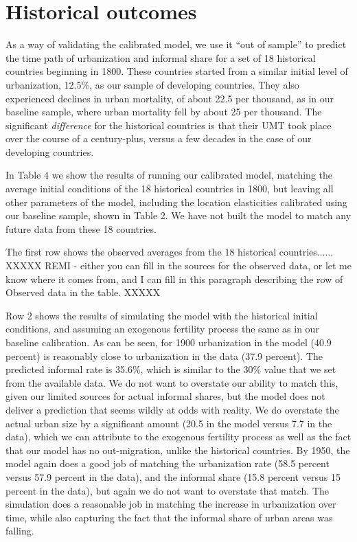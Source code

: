 \documentclass[10pt]{article}
\begin{document}
\onehalfspacing 

\section{Historical outcomes}

As a way of validating the calibrated model, we use it ``out of sample'' to predict the time path of urbanization and informal share for a set of 18 historical countries beginning in 1800. These countries started from a similar initial level of urbanization, 12.5\%, as our sample of developing countries. They also experienced declines in urban mortality, of about 22.5 per thousand, as in our baseline sample, where urban mortality fell by about 25 per thousand. The significant \textit{difference} for the historical countries is that their UMT took place over the course of a century-plus, versus a few decades in the case of our developing countries.

In Table 4 we show the results of running our calibrated model, matching the average initial conditions of the 18 historical countries in 1800, but leaving all other parameters of the model, including the location elasticities calibrated using our baseline sample, shown in Table 2. We have not built the model to match any future data from these 18 countries.

The first row shows the observed averages from the 18 historical countries......
XXXXX
REMI - either you can fill in the sources for the observed data, or let me know where it comes from, and I can fill in this paragraph describing the row of Observed data in the table.
XXXXX

Row 2 shows the results of simulating the model with the historical initial conditions, and assuming an exogenous fertility process the same as in our baseline calibration. As can be seen, for 1900 urbanization in the model (40.9 percent) is reasonably close to urbanization in the data (37.9 percent). The predicted informal rate is 35.6\%, which is similar to the 30\% value that we set from the available data. We do not want to overstate our ability to match this, given our limited sources for actual informal shares, but the model does not deliver a prediction that seems wildly at odds with reality. We do overstate the actual urban size by a significant amount (20.5 in the model versus 7.7 in the data), which we can attribute to the exogenous fertility process as well as the fact that our model has no out-migration, unlike the historical countries. By 1950, the model again does a good job of matching the urbanization rate (58.5 percent versus 57.9 percent in the data), and the informal share (15.8 percent versus 15 percent in the data), but again we do not want to overstate that match. The simulation does a reasonable job in matching the increase in urbanization over time, while also capturing the fact that the informal share of urban areas was falling. 
\end{document}
